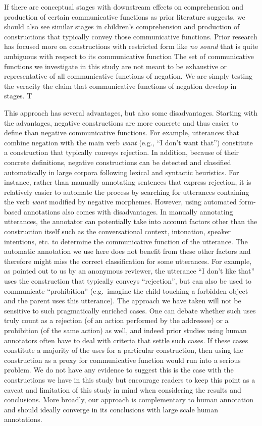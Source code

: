 \documentclass[
  man,floatsintext]{apa6}
\begin{document}
If there are conceptual stages with downstream effects on comprehension and production of certain communicative functions as prior literature suggests, we should also see similar stages in children's comprehension and production of constructions that typically convey those communicative functions. Prior research has focused more on constructions with restricted form like \emph{no sound} that is quite ambiguous with respect to its communicative function The set of communicative functions we investigate in this study are not meant to be exhaustive or representative of all communicative functions of negation. We are simply testing the veracity the claim that communicative functions of negation develop in stages. T

This approach has several advantages, but also some disadvantages. Starting with the advantages, negative constructions are more concrete and thus easier to define than negative communicative functions. For example, utterances that combine negation with the main verb \emph{want} (e.g., ``I don't want that'') constitute a construction that typically conveys rejection. In addition, because of their concrete definitions, negative constructions can be detected and classified automatically in large corpora following lexical and syntactic heuristics. For instance, rather than manually annotating sentences that express rejection, it is relatively easier to automate the process by searching for utterances containing the verb \emph{want} modified by negative morphemes. However, using automated form-based annotations also comes with disadvantages. In manually annotating utterances, the annotator can potentially take into account factors other than the construction itself such as the conversational context, intonation, speaker intentions, etc. to determine the communicative function of the utterance. The automatic annotation we use here does not benefit from these other factors and therefore might miss the correct classification for some utterances. For example, as pointed out to us by an anonymous reviewer, the utterance ``I don't like that'' uses the construction that typically conveys ``rejection'', but can also be used to communicate ``prohibition'' (e.g.~imagine the child touching a forbidden object and the parent uses this utterance). The approach we have taken will not be sensitive to such pragmatically enriched cases. One can debate whether such uses truly count as a rejection (of an action performed by the addressee) or a prohibition (of the same action) as well, and indeed prior studies using human annotators often have to deal with criteria that settle such cases. If these cases constitute a majority of the uses for a particular construction, then using the construction as a proxy for communicative function would run into a serious problem. We do not have any evidence to suggest this is the case with the constructions we have in this study but encourage readers to keep this point as a caveat and limitation of this study in mind when considering the results and conclusions. More broadly, our approach is complementary to human annotation and should ideally converge in its conclusions with large scale human annotations.
\end{document}
